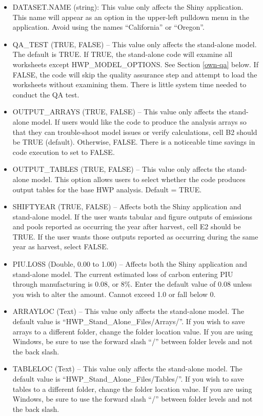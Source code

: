 \documentclass[
]{book}
\begin{document}
\begin{itemize}
\item
  DATASET.NAME (string): This value only affects the Shiny application. This name will appear as an option in the upper-left pulldown menu in the application. Avoid using the names ``California'' or ``Oregon''.
\item
  QA\_TEST (TRUE, FALSE) -- This value only affects the stand-alone model. The default is TRUE. If TRUE, the stand-alone code will examine all worksheets except HWP\_MODEL\_OPTIONS. See Section \ref{own-qa} below. If FALSE, the code will skip the quality assurance step and attempt to load the worksheets without examining them. There is little system time needed to conduct the QA test.
\item
  OUTPUT\_ARRAYS (TRUE, FALSE) -- This value only affects the stand-alone model. If users would like the code to produce the analysis arrays so that they can trouble-shoot model issues or verify calculations, cell B2 should be TRUE (default). Otherwise, FALSE. There is a noticeable time savings in code execution to set to FALSE.
\item
  OUTPUT\_TABLES (TRUE, FALSE) -- This value only affects the stand-alone model. This option allows users to select whether the code produces output tables for the base HWP analysis. Default = TRUE.
\item
  SHIFTYEAR (TRUE, FALSE) -- Affects both the Shiny application and stand-alone model. If the user wants tabular and figure outputs of emissions and pools reported as occurring the year after harvest, cell E2 should be TRUE. If the user wants those outputs reported as occurring during the same year as harvest, select FALSE.
\item
  PIU.LOSS (Double, 0.00 to 1.00) -- Affects both the Shiny application and stand-alone model. The current estimated loss of carbon entering PIU through manufacturing is 0.08, or 8\%. Enter the default value of 0.08 unless you wish to alter the amount. Cannot exceed 1.0 or fall below 0.
\item
  ARRAYLOC (Text) -- This value only affects the stand-alone model. The default value is ``HWP\_Stand\_Alone\_Files/Arrays/''. If you wish to save arrays to a different folder, change the folder location value. If you are using Windows, be sure to use the forward slash ``/'' between folder levels and not the back slash.
\item
  TABLELOC (Text) -- This value only affects the stand-alone model. The default value is ``HWP\_Stand\_Alone\_Files/Tables/''. If you wish to save tables to a different folder, change the folder location value. If you are using Windows, be sure to use the forward slash ``/'' between folder levels and not the back slash.

\end{itemize}
\end{document}
